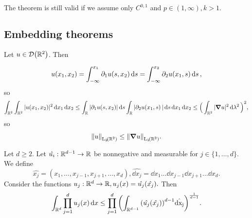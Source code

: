 \documentclass{article}
\begin{document}
\begin{remark}
	The theorem is still valid if we assume only $C^{0,1}$ and $p \in (1,\infty), k>1.$
\end{remark}

\subsection{Embedding theorems}
\label{sec:embedding}

\begin{example}
	Let $u \in \mathcal{D}\qty({\mathbb R}^2)$. Then 

	\begin{equation*}
		u\qty(x_1,x_2) = \int_{-\infty}^{x_1} \partial_{1}u\qty(s,x_2)\dd{s} = \int_{-\infty}^{x_2} \partial_{2}u(x_1,s)\dd{s},
	\end{equation*}
	so 
	\begin{equation*}
		\int_{{\mathbb R}^2}\int_{{\mathbb R}^2}|u(x_1,x_2)|^{2}\dd{x_1} \dd{x_2} \leq \int_{{\mathbb R}}|\partial_{1}u(s,x_2)|\dd{s} \int_{{\mathbb R}}|\partial_{2}u\qty(x_1,s)|\dd{s} \dd{x_1} \dd{x_2} \leq \Big(\int_{{\mathbb R}^2}|\grad u|^{2}\dd{\lambda^{2}}\Big)^{2},
	\end{equation*}
	so
	\[
		\norm{u}_{\LpSet[2]{\R^2}} \leq \norm{\grad u}_{\LpSet[1]{\R^2}}.
	\]
\end{example}

\begin{lemma}
	Let $d\geq 2$. Let $\hat{u_i}:{\mathbb R}^{d-1} \to {\mathbb R}$ be nonnegative and measurable for $j \in \{1,\dots,d\}.$ We define
	\[
		\hat{x_j} = (x_1, \dots, x_{j-1}, x_{j+1}, \dots, x_d), \hat{\dd{x_j}} = \dd{x_1} \dots \dd{x_{j-1}} \dd{x_{j+1}} \dots \dd{x_d}.
	\]
	Consider the functions $u_j:{\mathbb R}^d \to {\mathbb R}, u_j\qty(x)=\hat{u_j}(\hat{x_j}).$ Then
	\begin{equation}
		\int_{{\mathbb R}^d}\prod_{j=1}^d u_j\qty(x)\dd{x} \leq \prod_{j=1}^d \qty(\int_{{\mathbb R}^{d-1}}\qty(\hat{u_j}\qty(\hat{x_j}))^{d-1}\hat{\dd{x_j}})^{\frac{1}{d-1}}.
	\end{equation}
\end{lemma}
\end{document}
